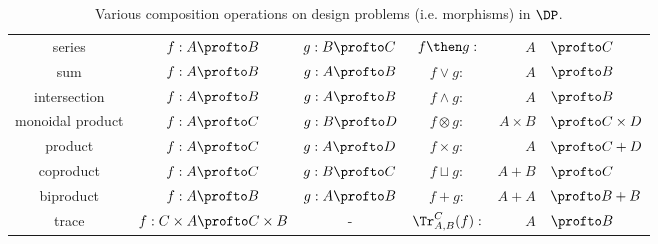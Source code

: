 \begin{table}[t!]
    \centering
\begin{tabular}{c|c|c|crl}
    series &
    $f:A\profto B$&
    $g:B\profto C$&
    $f\then g:$&$A$&$\profto C$ \\
    sum &
    $f:A\profto B$ &
    $g:A\profto B$ &
    $f\vee g:$&$A$&$\profto B$ \\
    intersection &
    $f:A\profto B$ &
    $g:A\profto B$ &
    $f\wedge g:$&$A$&$\profto B$ \\
    monoidal product &
    $f:A\profto C$&
    $g:B\profto D$ &
    $f\otimes g:$&$A\times B$&$\profto C \times D$ \\
    product &
    $f:A\profto C$&
    $g:A\profto D$ &
    $f\times g:$&$A $&$\profto C + D$ \\
    coproduct &
    $f:A\profto C$&
    $g:B\profto C$ &
    $f\sqcup g:$&$A + B $&$\profto C$ \\
    biproduct &
    $f:A\profto B$ &
    $g:A\profto B$ &
    $f+ g:$&$A + A$&$\profto B + B$ \\
    trace &
    $f: C \times A \profto C \times B$ &
    -&
    $\Tr_{A,B}^C(f) :$&$A$&$\profto B$
\end{tabular}
    \caption{Various composition operations on design problems (i.e. morphisms) in $\DP$.}
\end{table}
